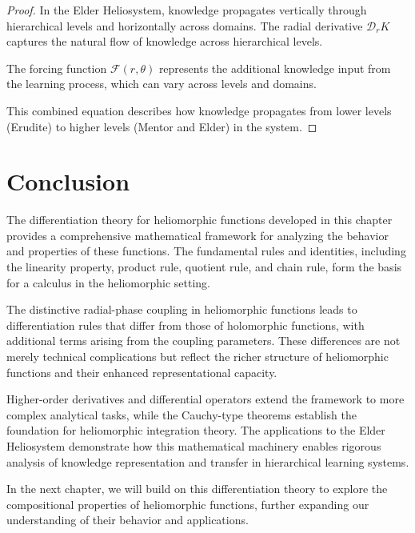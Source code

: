 \begin{proof}
In the Elder Heliosystem, knowledge propagates vertically through hierarchical levels and horizontally across domains. The radial derivative $\mathcal{D}_r K$ captures the natural flow of knowledge across hierarchical levels.

The forcing function $\mathcal{F}(r,\theta)$ represents the additional knowledge input from the learning process, which can vary across levels and domains.

This combined equation describes how knowledge propagates from lower levels (Erudite) to higher levels (Mentor and Elder) in the system.
\end{proof}

\section{Conclusion}

The differentiation theory for heliomorphic functions developed in this chapter provides a comprehensive mathematical framework for analyzing the behavior and properties of these functions. The fundamental rules and identities, including the linearity property, product rule, quotient rule, and chain rule, form the basis for a calculus in the heliomorphic setting.

The distinctive radial-phase coupling in heliomorphic functions leads to differentiation rules that differ from those of holomorphic functions, with additional terms arising from the coupling parameters. These differences are not merely technical complications but reflect the richer structure of heliomorphic functions and their enhanced representational capacity.

Higher-order derivatives and differential operators extend the framework to more complex analytical tasks, while the Cauchy-type theorems establish the foundation for heliomorphic integration theory. The applications to the Elder Heliosystem demonstrate how this mathematical machinery enables rigorous analysis of knowledge representation and transfer in hierarchical learning systems.

In the next chapter, we will build on this differentiation theory to explore the compositional properties of heliomorphic functions, further expanding our understanding of their behavior and applications.